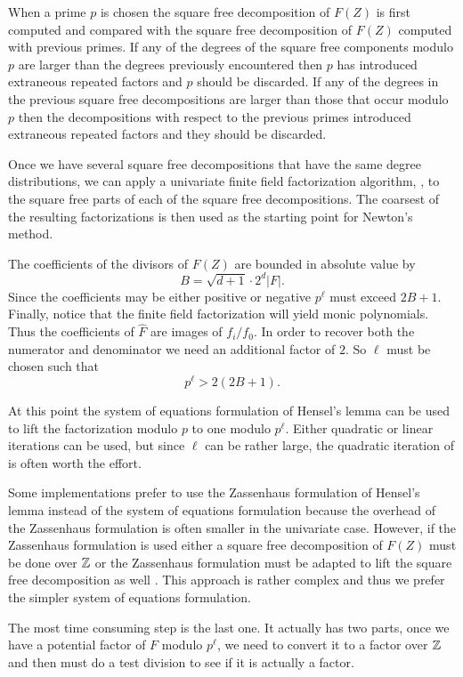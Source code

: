 When a prime $p$ is chosen the square free decomposition of $F(Z)$ is
first computed and compared with the square free decomposition of
$F(Z)$ computed with previous primes.  If any of the degrees of the
square free components modulo $p$ are larger than the degrees
previously encountered then $p$ has introduced extraneous repeated
factors and $p$ should be discarded.  If any of the degrees in the
previous square free decompositions are larger than those that occur
modulo $p$ then the decompositions with respect to the previous primes
introduced extraneous repeated factors and they should be discarded.  

Once we have several square free decompositions that have the same
degree distributions, we can apply a univariate finite field
factorization algorithm, \eg,  to the square free parts
of each of the square free decompositions.  The coarsest of the
resulting factorizations is then used as the starting point for
Newton's method. 

The coefficients of the divisors of $F(Z)$ are bounded in absolute
value by
\[
B = \sqrt{d+1} \cdot 2^d |F|.
\]
Since the coefficients may be either positive or negative $p^{\ell}$
must exceed $2B+1$.  Finally, notice that the finite field
factorization will yield monic polynomials.  Thus the coefficients of
$\hat{F}$ are images of $f_i/f_0$.  In order to recover both the
numerator and denominator we need an additional factor of $2$.  So
$\ell$ must be chosen such that
\[
p^{\ell} > 2(2B+1).
\]

At this point the system of equations formulation of Hensel's lemma
can be used to lift the factorization modulo $p$ to one modulo
$p^{\ell}$.  Either quadratic or linear iterations can be used, but
since $\ell$ can be rather large, the quadratic iteration of
 is often worth the effort.

Some implementations prefer to use the Zassenhaus formulation of
Hensel's lemma instead of the system of equations formulation because
the overhead of the Zassenhaus formulation is often smaller in the
univariate case.  However, if the Zassenhaus formulation is used
either a square free decomposition of $F(Z)$ must be done over $\mathbb{Z}$ or
the Zassenhaus formulation must be adapted to lift the square free
decomposition as well \cite{Trager79}.  This approach is rather
complex and thus we prefer the simpler system of equations
formulation.

\medskip
The most time consuming step is the last one.  It actually has two
parts, once we have a potential factor of $F$ modulo $p^{\ell}$, we
need to convert it to a factor over $\mathbb{Z}$ and then must do a test division 
to see if it is actually a factor.

